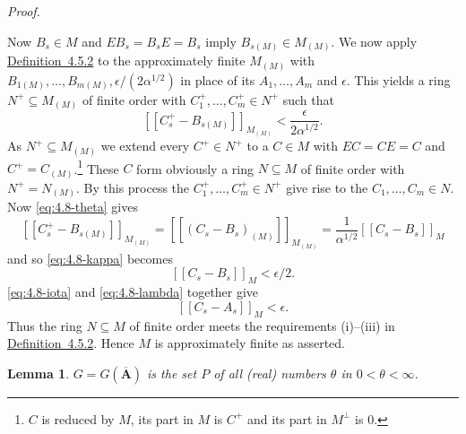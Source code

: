 \documentclass[b5paper,twoside]{article}
\newcommand{\defref}[2]{\hyperref[#1]{\mbox{Definition~#2}}}
\theoremstyle{mvnplain}
\newtheorem{lemma}{Lemma}[section]
\renewenvironment{proof}[1][Proof]{%
  \par\addvspace{0.35\baselineskip}%
  \noindent\textit{#1.}\ \normalfont\ignorespaces
}{%
  \par\addvspace{0.35\baselineskip}%
}
\newcommand{\M}{\mathbf M}
\newcommand{\N}{\mathbf N}
\newcommand{\Metric}[1]{\left[\!\left[#1\right]\!\right]}
\def\M{M}%
\def\N{N}%
\def\Metric#1{[[#1]]}%
\def\mathfrak#1{#1}%
\begin{document}
\begin{proof}
Now \(B_s\in\M\) and \(EB_s=B_sE=B_s\) imply
\(B_{s(\mathfrak M)}\in\M_{(\mathfrak M)}\). We now apply
\defref{def:4.5.2}{4.5.2} to the approximately finite
\(\M_{(\mathfrak M)}\) with
\(B_{1(\mathfrak M)},\ldots,B_{m(\mathfrak M)},
\epsilon/(2\alpha^{1/2})\) in
place of its \(A_1,\ldots,A_m\) and \(\epsilon\). This yields a ring
\(\N^+\subseteq\M_{(\mathfrak M)}\) of finite order with
\(C_1^+,\ldots,C_m^+\in\N^+\) such that
\begin{equation}\tag{4.8.\(\kappa\)}\label{eq:4.8-kappa}
 \Metric{C_s^+-B_{s(\mathfrak M)}}_{\M_{(\mathfrak M)}}
 <\frac{\epsilon}{2\alpha^{1/2}}.
\end{equation}
As \(\N^+\subseteq\M_{(\mathfrak M)}\) we extend every \(C^+\in\N^+\) to a
\(C\in\M\) with \(EC=CE=C\) and \(C^+=C_{(\mathfrak M)}\).\footnote{
\(C\) is reduced by \(\mathfrak M\), its part in \(\mathfrak M\) is \(C^+\)
and its part in \(\mathfrak M^{\perp}\) is 0.} These \(C\) form obviously a
ring \(\N\subseteq\M\) of finite order with
\(\N^+=\N_{(\mathfrak M)}\). By this process the
\(C_1^+,\ldots,C_m^+\in\N^+\) give rise to the
\(C_1,\ldots,C_m\in\N\). Now \eqref{eq:4.8-theta} gives
\[
 \Metric{C_s^+-B_{s(\mathfrak M)}}_{\M_{(\mathfrak M)}}
 =\Metric{(C_s-B_s)_{(\mathfrak M)}}_{\M_{(\mathfrak M)}}
 =\frac1{\alpha^{1/2}}\Metric{C_s-B_s}_{\M}
\]
and so \eqref{eq:4.8-kappa} becomes
\begin{equation}\tag{4.8.\(\lambda\)}\label{eq:4.8-lambda}
 \Metric{C_s-B_s}_{\M}<\epsilon/2.
\end{equation}
\eqref{eq:4.8-iota} and \eqref{eq:4.8-lambda} together give
\begin{equation}\tag{4.8.\(\mu\)}\label{eq:4.8-mu}
 \Metric{C_s-A_s}_{\M}<\epsilon.
\end{equation}
Thus the ring \(\N\subseteq\M\) of finite order meets the requirements
(i)--(iii) in \defref{def:4.5.2}{4.5.2}. Hence \(\M\) is approximately finite
as asserted.
\end{proof}

\begin{lemma}\label{lem:4.8.4}
\(\mathfrak G=\mathfrak G(\overline{\mathbf A})\) is the set \(P\) of all
(real) numbers \(\theta\) in \(0<\theta<\infty\).
\end{lemma}
\end{document}
